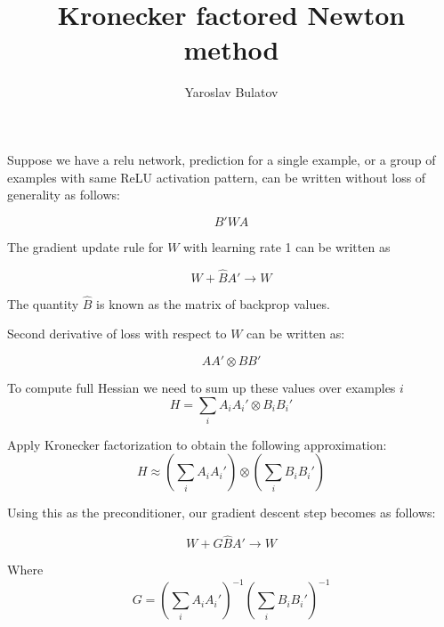 \documentclass{article}
\begin{document}
\title{Kronecker factored Newton method}
\author{Yaroslav Bulatov}

\maketitle

Suppose we have a relu network, prediction for a single example, or a group of examples with same ReLU activation pattern, can be written without loss of generality as follows:

$$B'WA$$

The gradient update rule for $W$ with learning rate 1 can be written as

$$W + \hat{B}A' \to W$$

The quantity $\hat{B}$ is known as the matrix of backprop values.

Second derivative of loss with respect to $W$ can be written as:

$$AA' \otimes BB'$$

To compute full Hessian we need to sum up these values over examples $i$
$$H = \sum_i A_i A_i' \otimes B_iB_i'$$

Apply Kronecker factorization to obtain the following approximation:
$$H \approx (\sum_i A_i A_i') \otimes (\sum_i B_iB_i')$$

Using this as the preconditioner, our gradient descent step becomes as follows:

$$W + G \hat{B}A' \to W$$

Where
$$G = (\sum_i A_i A_i')^{-1}(\sum_i B_iB_i')^{-1}$$
\end{document}

